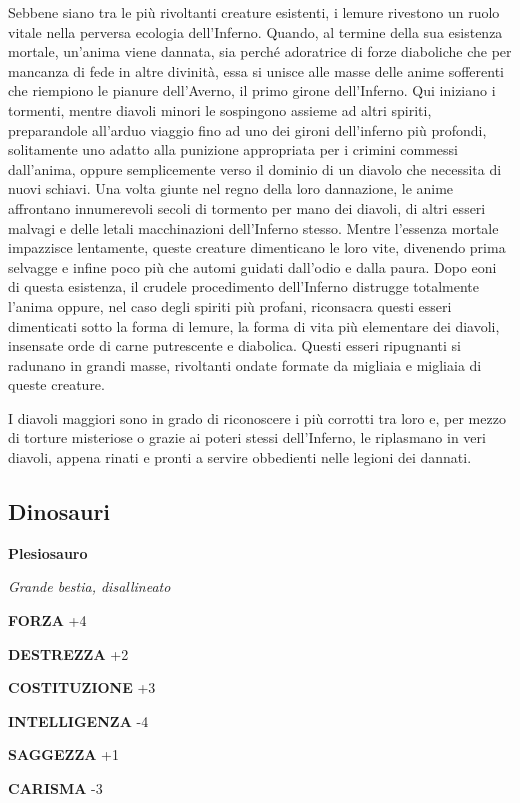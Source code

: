 \begin{multicols}{2}
Sebbene siano tra le più rivoltanti creature esistenti, i lemure rivestono un ruolo vitale nella perversa ecologia dell'Inferno. Quando, al termine della sua esistenza mortale, un'anima viene dannata, sia perché adoratrice di forze diaboliche che per mancanza di fede in altre divinità, essa si unisce alle masse delle anime sofferenti che riempiono le pianure dell'Averno, il primo girone dell'Inferno. Qui iniziano i tormenti, mentre diavoli minori le sospingono assieme ad altri spiriti, preparandole all'arduo viaggio fino ad uno dei gironi dell'inferno più profondi, solitamente uno adatto alla punizione appropriata per i crimini commessi dall'anima, oppure semplicemente verso il dominio di un diavolo che necessita di nuovi schiavi. Una volta giunte nel regno della loro dannazione, le anime affrontano innumerevoli secoli di tormento per mano dei diavoli, di altri esseri malvagi e delle letali macchinazioni dell'Inferno stesso. Mentre l'essenza mortale impazzisce lentamente, queste creature dimenticano le loro vite, divenendo prima selvagge e infine poco più che automi guidati dall'odio e dalla paura. Dopo eoni di questa esistenza, il crudele procedimento dell'Inferno distrugge totalmente l'anima oppure, nel caso degli spiriti più profani, riconsacra questi esseri dimenticati sotto la forma di lemure, la forma di vita più elementare dei diavoli, insensate orde di carne putrescente e diabolica. Questi esseri ripugnanti si radunano in grandi masse, rivoltanti ondate formate da migliaia e migliaia di queste creature.

I diavoli maggiori sono in grado di riconoscere i più corrotti tra loro e, per mezzo di torture misteriose o grazie ai poteri stessi dell'Inferno, le riplasmano in veri diavoli, appena rinati e pronti a servire obbedienti nelle legioni dei dannati.


\subsection{Dinosauri}

\medskip{}\textbf{Plesiosauro}

\textit{Grande bestia, disallineato}

\textbf{FORZA} +4

\textbf{DESTREZZA} +2

\textbf{COSTITUZIONE} +3

\textbf{INTELLIGENZA} -4

\textbf{SAGGEZZA} +1

\textbf{CARISMA} -3


\end{multicols}
